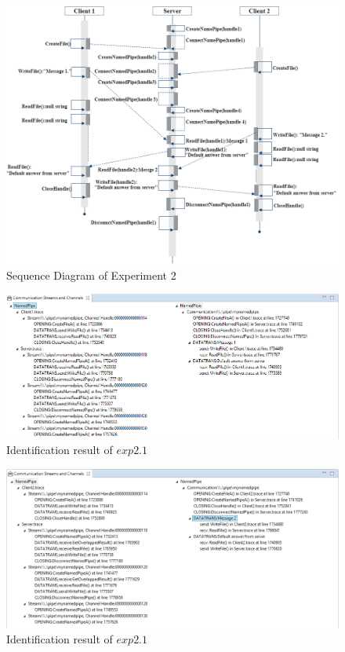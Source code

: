 \begin{figure}[H]
\centerline{\includegraphics[scale=0.6]{Figures/exp2}}
 \caption{Sequence Diagram of Experiment 2}
\label{exp2}
\end{figure}

\begin{figure}[H]
\centerline{\includegraphics[scale=0.65]{Figures/result21}}
 \caption{Identification result of $exp2.1$}
\label{result21}
\end{figure}

\begin{figure}[H]
\centerline{\includegraphics[scale=0.65]{Figures/result22}}
 \caption{Identification result of $exp2.1$}
\label{result22}
\end{figure}



